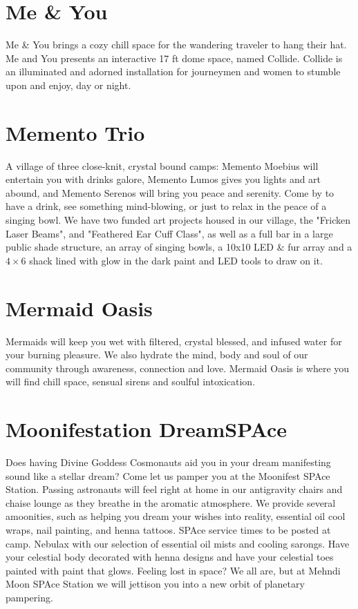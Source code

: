 \begin{multicols}{2}
\section*{Me \& You}
Me \& You brings a cozy chill space for the wandering traveler to hang their hat. Me and You presents an interactive 17 ft dome space, named Collide. Collide is an illuminated and adorned installation for journeymen and women to stumble upon and enjoy, day or night. 


\section*{Memento Trio}
A village of three close-knit, crystal bound camps: Memento Moebius will entertain you with drinks galore, Memento Lumos gives you lights and art abound, and Memento Serenos will bring you peace and serenity. Come by to have a drink, see something mind-blowing, or just to relax in the peace of a singing bowl. We have two funded art projects housed in our village, the "Fricken Laser Beams", and "Feathered Ear Cuff Class", as well as a full bar in a large public shade structure, an array of singing bowls, a 10x10 LED \& fur array and a $4 \times 6$ shack lined with glow in the dark paint and LED tools to draw on it.


\section*{Mermaid Oasis}
Mermaids will keep you wet with filtered, crystal blessed, and infused water for your burning pleasure. We also hydrate the mind, body and soul of our community through awareness, connection and love. Mermaid Oasis is where you will find chill space, sensual sirens and soulful intoxication. 


\section*{Moonifestation DreamSPAce}
Does having Divine Goddess Cosmonauts aid you in your dream manifesting sound like a stellar dream? Come let us pamper you at the Moonifest SPAce Station. Passing astronauts will feel right at home in our antigravity chairs and chaise lounge as they breathe in the aromatic atmosphere. We provide several amoonities, such as helping you dream your wishes into reality, essential oil cool wraps, nail painting, and henna tattoos. SPAce service times to be posted at camp. Nebulax with our selection of essential oil mists and cooling sarongs. Have your celestial body decorated with henna designs and have your celestial toes painted with paint that glows. Feeling lost in space? We all are, but at Mehndi Moon SPAce Station we will jettison you into a new orbit of planetary pampering.



\end{multicols}
